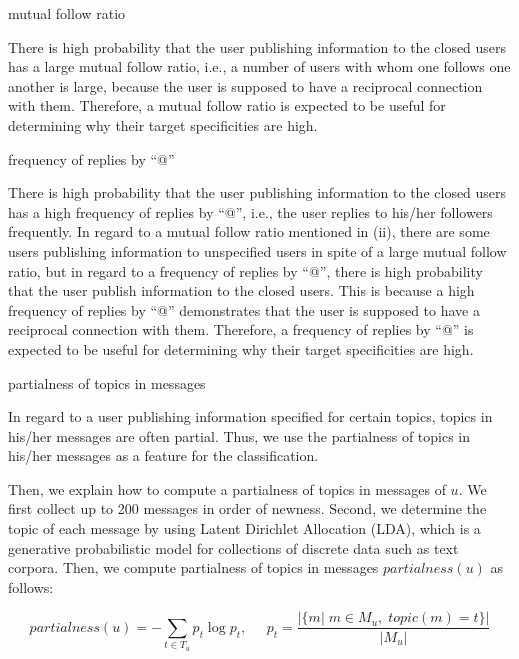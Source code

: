 \begin{description}
\bf {\item[(ii)] mutual follow ratio}
\end{description}

There is high probability that the user publishing information to the
closed users has a large mutual follow ratio, i.e., a number of users
with whom one follows one another is large, because the user is supposed
to have a reciprocal connection with them.  Therefore, a mutual follow
ratio is expected to be useful for determining why their target
specificities are high.

\begin{description}
\bf {\item[(iii)] frequency of replies by ``@''}
\end{description}

There is high probability that the user publishing information to the
closed users has a high frequency of replies by ``@'', i.e., the user
replies to his/her followers frequently. In regard to a mutual follow
ratio mentioned in (ii), there are some users publishing information to
unspecified users in spite of a large mutual follow ratio, but in regard
to a frequency of replies by ``@'', there is high probability that the
user publish information to the closed users.  This is because a high
frequency of replies by ``@'' demonstrates that the user is supposed to
have a reciprocal connection with them.  Therefore, a frequency of
replies by ``@'' is expected to be useful for determining why their
target specificities are high.

\begin{description}
\bf {\item[(iv)] partialness of topics in messages}
\end{description}

In regard to a user publishing information specified for certain topics,
topics in his/her messages are often partial.  Thus, we use the
partialness of topics in his/her messages as a feature for the
classification.

Then, we explain how to compute a partialness of topics in messages of
$u$.  We first collect up to 200 messages in order of newness.  Second,
we determine the topic of each message by using Latent Dirichlet
Allocation (LDA), which is a generative probabilistic model for
collections of discrete data such as text corpora.  Then, we compute
partialness of topics in messages $\mathit{partialness}(u)$ as follows:

\vspace{-3ex}
\[
 \mathit{partialness}(u) = - \sum_{t \in T_u} p_t \log p_t,\;\;\;\;\;
 p_t = \frac{|\{m|\;m \in M_u,\;\mathit{topic}(m) = t\}|}{|M_u|}
\]
\vspace{-3ex}

